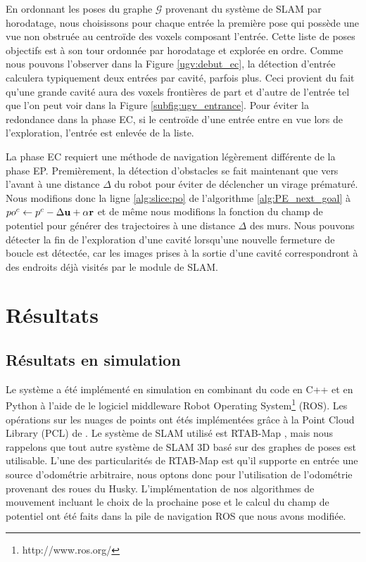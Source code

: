 En ordonnant les poses du graphe $\mathcal G$ provenant du système de SLAM par horodatage, nous choisissons pour chaque entrée la première pose qui possède une vue non obstruée au centroïde des voxels composant l'entrée. Cette liste de poses objectifs est à son tour ordonnée par horodatage et explorée en ordre. Comme nous pouvons l'observer dans la Figure \ref{ugv:debut_ec}, la détection d'entrée calculera typiquement deux entrées par cavité, parfois plus. Ceci provient du fait qu’une grande cavité aura des voxels frontières de part et d'autre de l'entrée tel que l'on peut voir dans la Figure \ref{subfig:ugv_entrance}.  Pour éviter la redondance dans la phase EC, si le centroïde d'une entrée entre en vue lors de l'exploration, l'entrée est enlevée de la liste.

La phase EC requiert une méthode de navigation légèrement différente de la phase EP. Premièrement, la détection d'obstacles se fait maintenant que vers l'avant à une distance $\Delta$ du robot pour éviter de déclencher un virage prématuré. Nous modifions donc la ligne \ref{alg:slice:po} de l'algorithme \ref{alg:PE_next_goal} à ${po^c} \gets p^c - \Delta \mathbf{u} + \alpha \mathbf{r}$ et de même nous modifions la fonction du champ de potentiel pour générer des trajectoires à une distance $\Delta$ des murs. Nous pouvons détecter la fin de l'exploration d'une cavité lorsqu'une nouvelle fermeture de boucle est détectée, car les images prises à la sortie d'une cavité correspondront à des endroits déjà visités par le module de SLAM.

\section{Résultats} \label{sec:ugv_results}

\subsection{Résultats en simulation}

Le système a été implémenté en simulation en combinant du code en C++ et en Python à l'aide de le logiciel middleware Robot Operating System\footnote{http://www.ros.org/} (ROS). Les opérations sur les nuages de points ont étés implémentées grâce à la Point Cloud Library (PCL) de \citep{Rusu2011}. Le système de SLAM utilisé est RTAB-Map \citep{Labbe2014}, mais nous rappelons que tout autre système de SLAM 3D basé sur des graphes de poses est utilisable. L'une des particularités de RTAB-Map est qu'il supporte en entrée une source d'odométrie arbitraire, nous optons donc pour l'utilisation de l'odométrie provenant des roues du Husky. L'implémentation de nos algorithmes de mouvement incluant le choix de la prochaine pose et le calcul du champ de potentiel ont été faits dans la pile de navigation ROS \citep{Mader2010} que nous avons modifiée.

